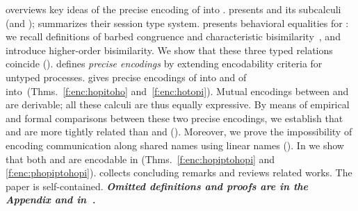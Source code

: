  overviews key ideas of the precise encoding of \HOp into \sessp.
{} presents \HOp and its 
subcalculi (\HO and \sessp); %
 summarizes their session type system.
 presents  behavioral equalities for \HOp:
we recall definitions of barbed congruence and characteristic bisimilarity~\cite{characteristic_bis}, 
and introduce higher-order bisimilarity.
We show that these three typed relations coincide ().
 defines \emph{precise %
encodings} by extending encodability criteria  for untyped processes. %
{} %
gives {precise encodings} of \HOp into \HO and of \HOp into~\sessp (Thms.~\ref{f:enc:hopitoho} and~\ref{f:enc:hotopi}).
Mutual encodings between \sessp and \HO are derivable; 
all these calculi are thus equally expressive.
By means of empirical and formal comparisons between these two precise encodings, we establish that
\HOp and \HO are more tightly related than \HOp and \sessp ().
Moreover, we prove the impossibility of encoding communication along shared names
using linear names ().
In  %
we show that both \HOpp 
and \PHOp 
are encodable in \HOp
(Thms.~\ref{f:enc:hopiptohopi} and \ref{f:enc:phopiptohopi}).
{} collects concluding remarks and reviews related works.
The paper is self-contained. 
{\bf\em Omitted definitions and  proofs 
are in the Appendix and in~\cite{KouzapasPY15}.} 

